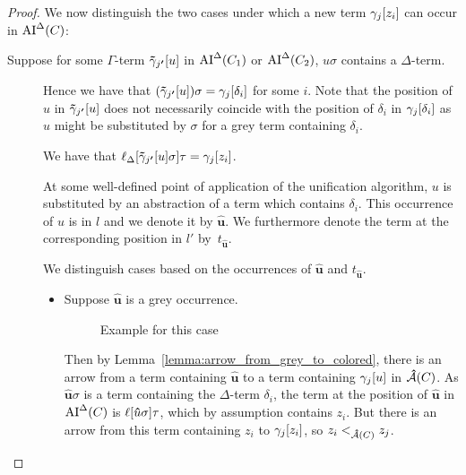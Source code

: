 \documentclass[,%
	paper=a4,%
	DIV10, %
	twoside=false,%
	liststotoc,
	bibtotoc,
	draft=false,%
	numbers=noendperiod
]{scrartcl}
\begin{document}
\begin{proof}
	We now distinguish the two cases under which a new term $\gamma_j[z_i]$ can occur in $\operatorname{AI}^\Delta(C)$:

	\begin{description}
		\item[Suppose for some $\Gamma$-term $\bm\tilde\gamma_{j\bm'}[u]$ in $\operatorname{AI}^\Delta(C_1)$ or $\operatorname{AI}^\Delta(C_2)$, $u\sigma$ contains a $\Delta$-term.]\hfill\nopagebreak

			Hence we have that $(\bm\tilde\gamma_{j\bm'}[u])\sigma = \gamma_j[\delta_i]$ for some $i$.
			Note that the position of $u$ in $\bm\tilde\gamma_{j\bm'}[u]$ does not necessarily coincide with the position of $\delta_i$ in $\gamma_j[\delta_i]$ as $u$ might be substituted by $\sigma$ for a grey term containing $\delta_i$.

			We have that $\ell_{\Delta}[\bm\tilde\gamma_{j\bm'}[u]\sigma]\tau = \gamma_j[z_i]$.

			\newcommand{\hatu}{{\bm\hat u}}
			\newcommand{\hatuPrime}{t_{\bm\hat u}}
			At some well-defined point of application of the unification algorithm, $u$ is substituted by an abstraction of a term which contains $\delta_i$. This occurrence of $u$ is in $l$ and we denote it by $\hatu$.
			We furthermore denote the term at the corresponding position in $l'$ by~$\hatuPrime$.

			We distinguish cases based on the occurrences of $\hatu$ and $\hatuPrime$.
			\begin{itemize}
				\item Suppose $\hatu$ is a grey occurrence.

					\begin{figure}[h]
						\begin{prooftree}
							\AxiomCm{C_1: P(\oldgam\occ{u}) \lor Q(\hatu)}
							\AxiomCm{C_2: \lnot Q(\hatuPrime)}
						\end{prooftree} 
						\caption{Example for this case}
					\end{figure}

					Then by Lemma~\ref{lemma:arrow_from_grey_to_colored}, there is an arrow from a term containing $\hatu$ to a term containing $\gamma_j[u]$ in $\operatorname{{\mathcal{\bm{\hat}A}}}(C)$.
					As $\hatu\sigma$ is a term containing the $\Delta$-term $\delta_i$, the term at the position of $\hatu$ in $\operatorname{AI}^\Delta(C)$ is $\lifboth{\hatu\sigma}\tau$, which by assumption contains $z_i$. 
					But there is an arrow from this term containing $z_i$ to $\gamma_j[z_i]$, so $z_i <_{\operatorname{{\mathcal{\bm{\hat}A}}}(C)} z_j$.


					\begin{comment}%
						As $\hatu$ and $\hatuPrime$ are at corresponding positions in the resolved literal, their arrows are merged, so it suffices to show that there is an arrow from a term containing an occurrence of $z_i$ to the position of $\hatuPrime$.


\end{comment}
\end{itemize}
\end{description}
\end{proof}
\end{document}
